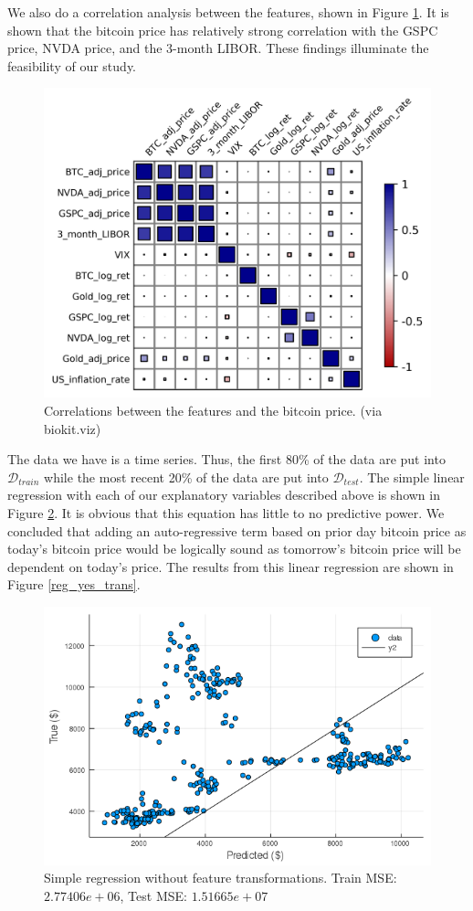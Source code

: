 \documentclass[9pt,twocolumn,twoside]{ilcss}
\begin{document}
We also do a correlation analysis between the features, shown in Figure \ref{corr}. It is shown that the bitcoin price has relatively strong correlation with the GSPC price, NVDA price, and the 3-month LIBOR. These findings illuminate the feasibility of our study. 

\begin{figure}[h]
\centering
\includegraphics[width=0.8\linewidth]{new_heat_map.png}
\caption{Correlations between the features and the bitcoin price. (via biokit.viz)}
\label{corr}
\end{figure}

The data we have is a time series. Thus, the first 80\% of the data are put into $\mathcal{D}_{train}$ while the most recent 20\% of the data are put into $\mathcal{D}_{test}$. The simple linear regression with each of our explanatory variables described above is shown in Figure \ref{reg_no_trans}. It is obvious that this equation has little to no predictive power. We concluded that adding an auto-regressive term based on prior day bitcoin price as today's bitcoin price would be logically sound as tomorrow's bitcoin price will be dependent on today's price. The results from this linear regression are shown in Figure \ref{reg_yes_trans}.

\begin{figure}[h]
\centering
\includegraphics[width=.75\linewidth]{Regression_w_o_lag.png}
\caption{Simple regression without feature transformations. Train MSE: $2.77406e+06$, Test MSE: $1.51665e+07$}
\label{reg_no_trans}
\end{figure}
\end{document}
